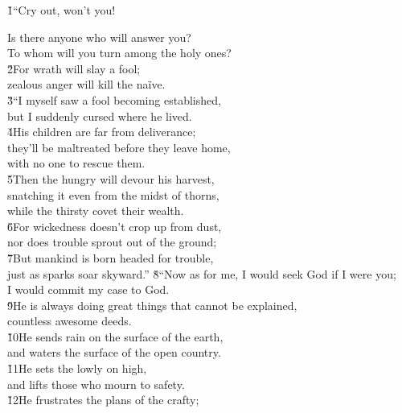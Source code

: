 \v{1}``Cry out, won't you!

\begin{poetry}
\poemll    Is there anyone who will answer you? \\
\poemlll       To whom will you turn among the holy ones? \\
\poeml \v{2}For wrath will slay a fool; \\
\poemll    zealous anger will kill the na\"{i}ve. \\
\poeml \v{3}``I myself saw a fool becoming established, \\
\poemll    but I suddenly cursed where he lived. \\
\poeml \v{4}His children are far from deliverance; \\
\poemll    they'll be maltreated before they leave home, \\
\poemlll       with no one to rescue them. \\
\poeml \v{5}Then the hungry will devour his harvest, \\
\poemll    snatching it even from the midst of thorns, \\
\poemlll       while the thirsty covet their wealth. \\
\poeml \v{6}For wickedness doesn't crop up from dust, \\
\poemll    nor does trouble sprout out of the ground; \\
\poeml \v{7}But mankind is born headed for trouble, \\
\poemll    just as sparks soar skyward.''
\poeml \v{8}``Now as for me, I would seek God if I were you; \\
\poemll    I would commit my case to God. \\
\poeml \v{9}He is always doing great things that cannot be explained, \\
\poemll    countless awesome deeds. \\
\poeml \v{10}He sends rain on the surface of the earth, \\
\poemll    and waters the surface of the open country. \\
\poeml \v{11}He sets the lowly on high, \\
\poemll    and lifts those who mourn to safety. \\
\poeml \v{12}He frustrates the plans of the crafty; \\

\end{poetry}
